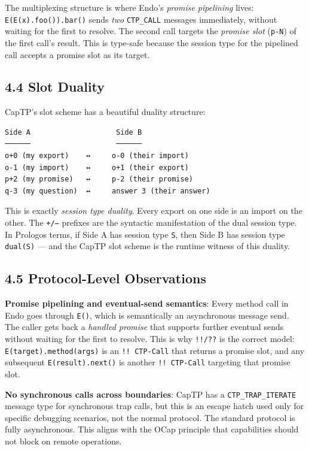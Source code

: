 \documentclass[11pt]{article}
\begin{document}
The multiplexing structure is where Endo's \emph{promise pipelining} lives:
\texttt{E(E(x).foo()).bar()} sends \emph{two} \texttt{CTP\_CALL} messages immediately, without
waiting for the first to resolve. The second call targets the \emph{promise slot}
(\texttt{p-N}) of the first call's result. This is type-safe because the session
type for the pipelined call accepts a promise slot as its target.
\subsection{4.4 Slot Duality}
\label{sec:org40a6826}

CapTP's slot scheme has a beautiful duality structure:

\begin{verbatim}
Side A                    Side B
──────                    ──────
o+0 (my export)    ↔     o-0 (their import)
o-1 (my import)    ↔     o+1 (their export)
p+2 (my promise)   ↔     p-2 (their promise)
q-3 (my question)  ↔     answer 3 (their answer)
\end{verbatim}

This is exactly \emph{session type duality}. Every export on one side is an import
on the other. The \texttt{+/−} prefixes are the syntactic manifestation of the
dual session type. In Prologos terms, if Side A has session type \texttt{S}, then
Side B has session type \texttt{dual(S)} --- and the CapTP slot scheme is the
runtime witness of this duality.
\subsection{4.5 Protocol-Level Observations}
\label{sec:orgf0e328e}

\textbf{Promise pipelining and eventual-send semantics}: Every method call in Endo
goes through \texttt{E()}, which is semantically an asynchronous message send. The
caller gets back a \emph{handled promise} that supports further eventual sends
without waiting for the first to resolve. This is why \texttt{!!/??} is the correct
model: \texttt{E(target).method(args)} is an \texttt{!! CTP-Call} that returns a promise
slot, and any subsequent \texttt{E(result).next()} is another \texttt{!! CTP-Call}
targeting that promise slot.

\textbf{No synchronous calls across boundaries}: CapTP has a \texttt{CTP\_TRAP\_ITERATE}
message type for synchronous trap calls, but this is an escape hatch used
only for specific debugging scenarios, not the normal protocol. The standard
protocol is fully asynchronous. This aligns with the OCap principle that
capabilities should not block on remote operations.
\end{document}
